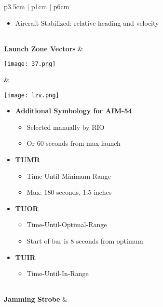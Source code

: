 \documentclass[8pt,usenames,dvipsnames,twoside]{article}
\begin{document}
\begin{center}
\begin{longtable}{p{3.5cm} | p{1cm} |  p{6cm}}
\begin{minipage}[t]{\linewidth}
\begin{itemize}
\begin{itemize}
							\item Aircraft Stabilized: relative heading and velocity
						\end{itemize}
					\end{itemize}
				\end{minipage} \\
				\midrule
				\textbf{Launch Zone Vectors} &
				\begin{minipage}[t]{\linewidth}
					\vspace{-7pt}
					\centering
					\texttt{[image: 37.png]}
				\end{minipage} &  
				\begin{minipage}[t]{\linewidth}
					\vspace{-7pt}
					\centering
					\texttt{[image: lzv.png]}
				\end{minipage}
				\begin{minipage}[t]{\linewidth}
					\begin{itemize}
						\item \textbf{Additional Symbology for AIM-54}
						\begin{itemize}
							\item Selected manually by RIO
							\item Or 60 seconds from max launch
						\end{itemize}
						\item \textbf{TUMR}
						\begin{itemize}
							\item Time-Until-Minimum-Range
							\item Max: 180 seconds, 1.5 inches
						\end{itemize}
						\item \textbf{TUOR}
						\begin{itemize}
							\item Time-Until-Optimal-Range
							\item Start of bar is 8 seconds from optimum
						\end{itemize}
						\item \textbf{TUIR}
						\begin{itemize}
							\item Time-Until-In-Range
						\end{itemize}
					\end{itemize}
				\end{minipage} \\
				\midrule
				\textbf{Jamming Strobe} &
				\begin{minipage}[t]{\linewidth}

\end{minipage}
\end{longtable}
\end{center}
\end{document}
